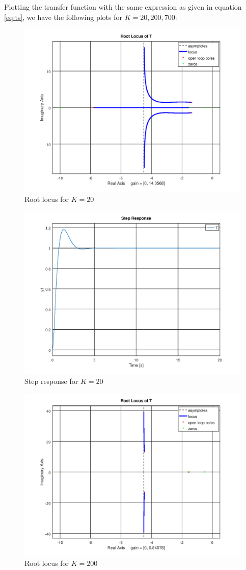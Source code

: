 \documentclass[12pt, a4paper]{article}
\begin{document}
		Plotting the transfer function with the same expression as given in equation \eqref{eq:ts}, we have the following plots for $K=20, 200, 700$:
		\begin{figure}[H]
			\centering
			\includegraphics[width=.8\textwidth]{img/rlocus_20.png}
			\caption{Root locus for $K = 20$}
			\label{fig:rlocus_20}
		\end{figure}

		\begin{figure}[H]
			\centering
			\includegraphics[width=.8\textwidth]{img/step_20.png}
			\caption{Step response for $K = 20$}
			\label{fig:step_20}
		\end{figure}

		\begin{figure}[H]
			\centering
			\includegraphics[width=.8\textwidth]{img/rlocus_200.png}
			\caption{Root locus for $K = 200$}
			\label{fig:rlocus_200}
		\end{figure}
\end{document}
